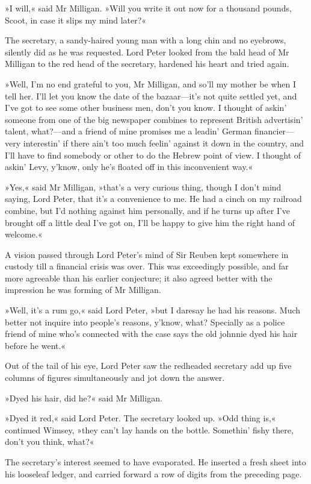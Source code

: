 »I will,« said Mr Milligan. »Will you write it out now for a thousand pounds, Scoot, in case it slips my mind later?«

The secretary, a sandy-haired young man with a long chin and no eyebrows, silently did as he was requested. Lord Peter looked from the bald head of Mr Milligan to the red head of the secretary, hardened his heart and tried again.

»Well, I'm no end grateful to you, Mr Milligan, and so'll my mother be when I tell her. I'll let you know the date of the bazaar—it's not quite settled yet, and I've got to see some other business men, don't you know. I thought of askin' someone from one of the big newspaper combines to represent British advertisin' talent, what?---and a friend of mine promises me a leadin' German financier—very interestin' if there ain't too much feelin' against it down in the country, and I'll have to find somebody or other to do the Hebrew point of view. I thought of askin' Levy, y'know, only he's floated off in this inconvenient way.«

»Yes,« said Mr Milligan, »that's a very curious thing, though I don't mind saying, Lord Peter, that it's a convenience to me. He had a cinch on my railroad combine, but I'd nothing against him personally, and if he turns up after I've brought off a little deal I've got on, I'll be happy to give him the right hand of welcome.«

A vision passed through Lord Peter's mind of Sir Reuben kept somewhere in custody till a financial crisis was over. This was exceedingly possible, and far more agreeable than his earlier conjecture; it also agreed better with the impression he was forming of Mr Milligan.

»Well, it's a rum go,« said Lord Peter, »but I daresay he had his reasons. Much better not inquire into people's reasons, y'know, what? Specially as a police friend of mine who's connected with the case says the old johnnie dyed his hair before he went.«

Out of the tail of his eye, Lord Peter saw the redheaded secretary add up five columns of figures simultaneously and jot down the answer.

»Dyed his hair, did he?« said Mr Milligan.

»Dyed it red,« said Lord Peter. The secretary looked up. »Odd thing is,« continued Wimsey, »they can't lay hands on the bottle. Somethin' fishy there, don't you think, what?«

The secretary's interest seemed to have evaporated. He inserted a fresh sheet into his looseleaf ledger, and carried forward a row of digits from the preceding page.

